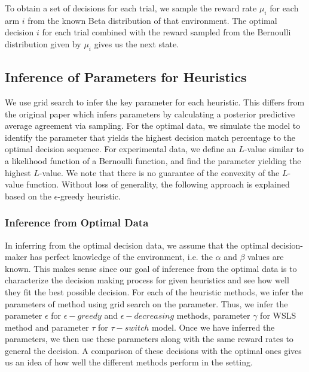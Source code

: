 To obtain a set of decisions for each trial, we sample the reward rate $\mu_i$ for each arm $i$ from the known Beta distribution of that environment. The optimal decision $i$ for each trial combined with the reward sampled from the Bernoulli distribution given by $\mu_i$ gives us the next state.


\subsection{Inference of Parameters for Heuristics}
We use grid search to infer the key parameter for each heuristic. This differs from the original paper which infers parameters by calculating a posterior predictive average agreement via sampling. For the optimal data, we simulate the model to identify the parameter that yields the highest decision match percentage to the optimal decision sequence. For experimental data, we define an $L$-value similar to a likelihood function of a Bernoulli function, and find the parameter yielding the highest $L$-value. We note that there is no guarantee of the convexity of the $L$-value function. Without loss of generality, the following approach is explained based on the $\epsilon$-greedy heuristic. 

\subsubsection{Inference from Optimal Data}
In inferring from the optimal decision data, we assume that the optimal decision-maker has perfect knowledge of the environment, i.e. the $\alpha$ and $\beta$ values are known. This makes sense since our goal of inference from the optimal data is to characterize the decision making process for given heuristics and see how well they fit the best possible decision. For each of the heuristic methods, we infer the parameters of method using grid search on the parameter. Thus, we infer the parameter $\epsilon$ for $\epsilon-greedy$ and $\epsilon-decreasing$ methods, parameter $\gamma$ for WSLS method and parameter $\tau$ for $\tau-switch$ model. Once we have inferred the parameters, we then use these parameters along with the same reward rates to general the decision. A comparison of these decisions with the optimal ones gives us an idea of how well the different methods perform in the setting. 

